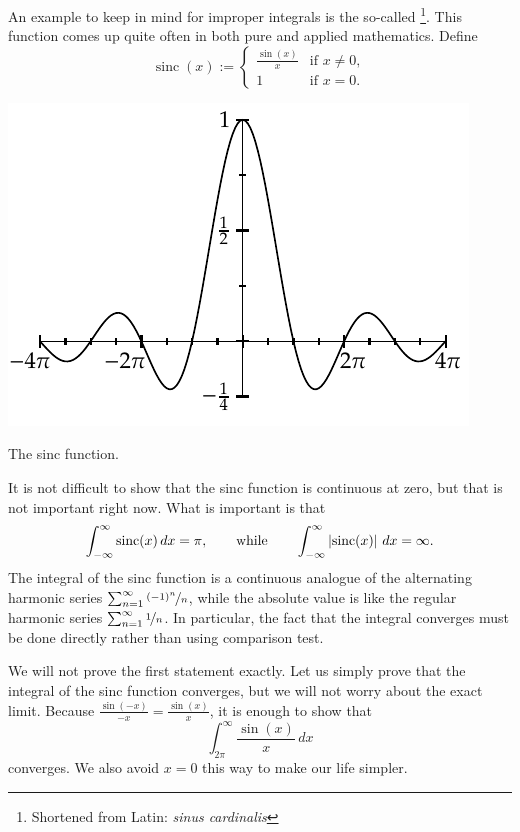 \begin{example}
An example to keep in mind for improper integrals
is the so-called \emph{}%
\footnote{Shortened from Latin: \emph{sinus cardinalis}}.
This function comes up quite often
in both pure and applied mathematics.  Define
\begin{equation*}
\operatorname{sinc}(x) :=
\begin{cases}
\frac{\sin(x)}{x} & \text{if } x \not= 0 , \\
1 & \text{if } x = 0 .
\end{cases}
\end{equation*}
\begin{myfigureht}
\includegraphics{figures/sincfig}
\caption{The sinc function.\label{figsinc}}
\end{myfigureht}

It is not difficult to show that
the sinc function is continuous at zero, but that is
not important right now.  What is important is that
\begin{equation*}
\int_{-\infty}^\infty \operatorname{sinc}(x) \,dx = \pi ,
\qquad \text{while} \qquad
\int_{-\infty}^\infty \left\lvert {\operatorname{sinc}(x)} \right\rvert \,dx = \infty .
\end{equation*}
The integral of the sinc function is a continuous analogue of the
alternating harmonic series $\sum_{n=1}^\infty \nicefrac{{(-1)}^n}{n}$, while the
absolute value is like the regular harmonic series $\sum_{n=1}^\infty \nicefrac{1}{n}$.
In particular, the fact that the integral converges must be done directly
rather than using comparison test.

We will not prove the first statement exactly.  Let us simply prove
that the integral of the sinc function converges, but we will not worry
about the exact limit.  Because $\frac{\sin(-x)}{-x} = \frac{\sin(x)}{x}$, it is
enough to show that
\begin{equation*}
\int_{2\pi}^\infty \frac{\sin(x)}{x}\,dx
\end{equation*}
converges.  We
also avoid $x=0$ this way to make our life simpler.


\end{example}
